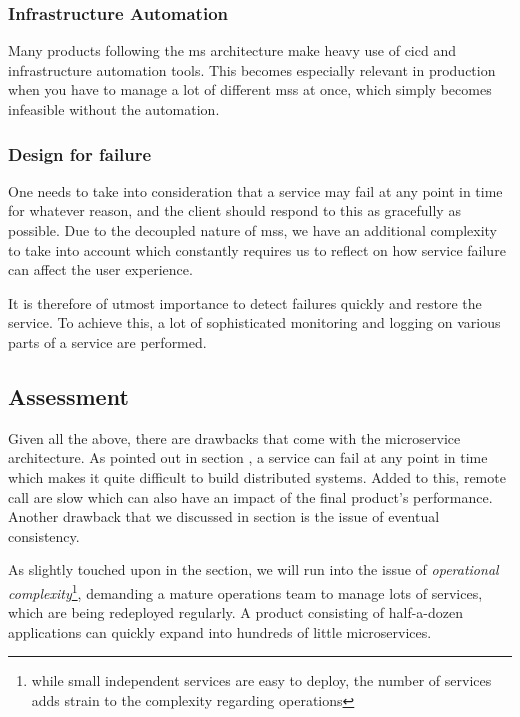 \subsubsection{Infrastructure Automation}
\label{sec:infrastructure-automation}

Many products following the \gls{ms} architecture make heavy use of
\gls{cicd} and infrastructure automation tools. This becomes
especially relevant in production when you have to manage a lot of
different \glspl{ms} at once, which simply becomes infeasible without
the automation.  \cite{ms-definition}

\subsubsection{Design for failure}
\label{sec:design-for-failure}

One needs to take into consideration that a service may fail at any
point in time for whatever reason, and the client should respond to
this as gracefully as possible. Due to the decoupled nature of
\glspl{ms}, we have an additional complexity to take into account
which constantly requires us to reflect on how service failure can
affect the user experience.  \cite{ms-definition}

It is therefore of utmost importance to detect failures quickly and
restore the service. To achieve this, a lot of sophisticated
monitoring and logging on various parts of a service are performed.
\cite{ms-definition}


\subsection{Assessment}%

Given all the above, there are drawbacks that come with the
microservice architecture. As pointed out in
section , a service can fail at any point
in time which makes it quite difficult to build distributed systems.
Added to this, remote call are slow which can also have an impact of
the final product's performance. Another drawback that we discussed
in section  is the issue of eventual
consistency.

As slightly touched upon in the
 section, we will run into the
issue of \textit{operational complexity}\footnote{while small
	independent services are easy to deploy, the number of services adds
strain to the complexity regarding operations}, demanding a mature
operations team to manage lots of services, which are being redeployed
regularly. A product consisting of half-a-dozen applications can
quickly expand into hundreds of little microservices.
\cite{ms-trade-off}


